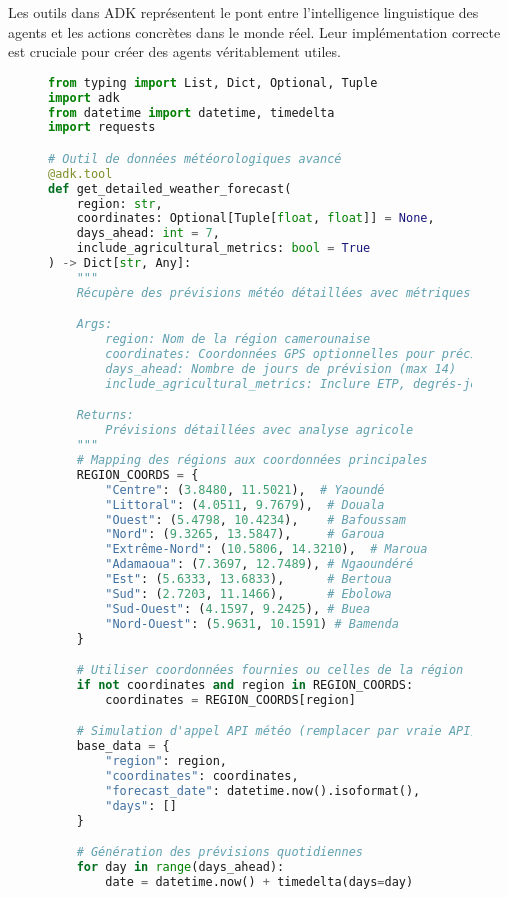 Les outils dans ADK représentent le pont entre l'intelligence linguistique des agents et les actions concrètes dans le monde réel. Leur implémentation correcte est cruciale pour créer des agents véritablement utiles.

\begin{figure}[H]
\centering
\begin{lstlisting}[language=Python, caption=Implémentation d'outils spécialisés pour l'agriculture]
from typing import List, Dict, Optional, Tuple
import adk
from datetime import datetime, timedelta
import requests

# Outil de données météorologiques avancé
@adk.tool
def get_detailed_weather_forecast(
    region: str,
    coordinates: Optional[Tuple[float, float]] = None,
    days_ahead: int = 7,
    include_agricultural_metrics: bool = True
) -> Dict[str, Any]:
    """
    Récupère des prévisions météo détaillées avec métriques agricoles.

    Args:
        region: Nom de la région camerounaise
        coordinates: Coordonnées GPS optionnelles pour précision
        days_ahead: Nombre de jours de prévision (max 14)
        include_agricultural_metrics: Inclure ETP, degrés-jours, etc.

    Returns:
        Prévisions détaillées avec analyse agricole
    """
    # Mapping des régions aux coordonnées principales
    REGION_COORDS = {
        "Centre": (3.8480, 11.5021),  # Yaoundé
        "Littoral": (4.0511, 9.7679),  # Douala
        "Ouest": (5.4798, 10.4234),    # Bafoussam
        "Nord": (9.3265, 13.5847),     # Garoua
        "Extrême-Nord": (10.5806, 14.3210),  # Maroua
        "Adamaoua": (7.3697, 12.7489), # Ngaoundéré
        "Est": (5.6333, 13.6833),      # Bertoua
        "Sud": (2.7203, 11.1466),      # Ebolowa
        "Sud-Ouest": (4.1597, 9.2425), # Buea
        "Nord-Ouest": (5.9631, 10.1591) # Bamenda
    }

    # Utiliser coordonnées fournies ou celles de la région
    if not coordinates and region in REGION_COORDS:
        coordinates = REGION_COORDS[region]

    # Simulation d'appel API météo (remplacer par vraie API)
    base_data = {
        "region": region,
        "coordinates": coordinates,
        "forecast_date": datetime.now().isoformat(),
        "days": []
    }

    # Génération des prévisions quotidiennes
    for day in range(days_ahead):
        date = datetime.now() + timedelta(days=day)


\end{lstlisting}
\end{figure}
